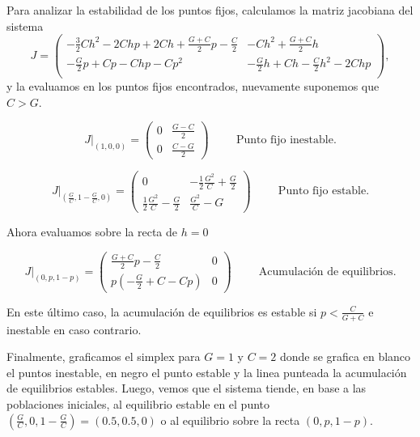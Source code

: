 \documentclass[letterpaper,12pt]{article}
\theoremstyle{plain}
\begin{document}
Para analizar la estabilidad de los puntos fijos, calculamos la matriz jacobiana del sistema 
\begin{equation}
    J =
\begin{pmatrix}
-\frac{3}{2}Ch^2 - 2Chp + 2Ch + \frac{G+C}{2}p - \frac{C}{2} & -Ch^2 + \frac{G+C}{2}h \\[6pt]
-\frac{G}{2}p + Cp - Chp - C p^2  &  -\frac{G}{2}h + Ch - \frac{C}{2} h^2 - 2Chp \\
\end{pmatrix},
\end{equation}
y la evaluamos en los puntos fijos encontrados, nuevamente suponemos que $C > G$.

\begin{equation}
J |_{\left(1,0,0\right)} =
\begin{pmatrix}
    0  & \frac{G-C}{2} \\
    0  & \frac{C-G}{2}
\end{pmatrix} \hspace{1cm} \text{Punto fijo inestable.}
\end{equation}

\begin{equation}
J |_{\left(\frac{G}{C},1-\frac{G}{C},0\right)}=
\begin{pmatrix}
    0  & -\frac{1}{2}\frac{G^2}{C} + \frac{G}{2} \\
    \frac{1}{2}\frac{G^2}{C} - \frac{G}{2}       & \frac{G^2}{C} - G
\end{pmatrix} \hspace{1cm} \text{Punto fijo estable.}
\end{equation}

Ahora evaluamos sobre la recta de $h=0$

\begin{equation}
J |_{\left(0,p,1-p\right)} =
\begin{pmatrix}
    \frac{G+C}{2}p - \frac{C}{2}  & 0 \\
    p\left(-\frac{G}{2} + C - Cp\right)       & 0
\end{pmatrix} \hspace{1cm} \text{Acumulación de equilibrios.}
\end{equation}

En este último caso, la acumulación de equilibrios es estable si $p<\frac{C}{G+C}$ e inestable en caso contrario.


Finalmente, graficamos el simplex para $G = 1$ y $C = 2$ donde se grafica en blanco el puntos inestable, en negro el punto estable y la linea punteada la acumulación de equilibrios estables. Luego, vemos que el sistema tiende, en base a las poblaciones iniciales, al equilibrio estable en el punto $(\frac{G}{C},0,1-\frac{G}{C}) = (0.5,0.5,0)$ o al equilibrio sobre la recta $(0,p,1-p)$.
\end{document}
